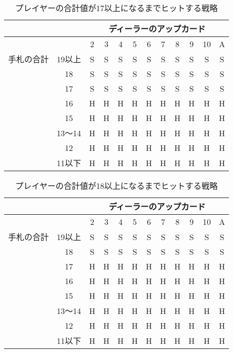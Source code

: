 \begin{table}[p]
  \centering
  \caption{プレイヤーの合計値が17以上になるまでヒットする戦略\label{hitleq17}}
  \begin{tabular}{|c|c|c|c|c|c|c|c|c|c|c|c|}
    \hline
    \multicolumn{2}{|c|}{} & \multicolumn{10}{|c|}{ディーラーのアップカード} \\ \hline
    \multicolumn{2}{|c|}{} & 2 & 3 & 4 & 5 & 6 & 7 & 8 & 9 & 10 & A \\ \hline
    手札の合計 & 19以上 & S & S & S & S & S & S & S & S & S & S \\ \cline{3-12}
              & 18 & S & S & S & S & S & S & S & S & S & S \\ \cline{3-12}
              & 17 & S & S & S & S & S & S & S & S & S & S \\ \cline{3-12}
              & 16 & H & H & H & H & H & H & H & H & H & H \\ \cline{3-12}
              & 15 & H & H & H & H & H & H & H & H & H & H \\ \cline{3-12}
              & 13～14 & H & H & H & H & H & H & H & H & H & H \\ \cline{3-12}
              & 12 & H & H & H & H & H & H & H & H & H & H \\ \cline{3-12}
              & 11以下 & H & H & H & H & H & H & H & H & H & H \\ \hline
  \end{tabular}
\end{table}

\begin{table}[p]
  \centering
  \caption{プレイヤーの合計値が18以上になるまでヒットする戦略\label{hitleq18}}
  \begin{tabular}{|c|c|c|c|c|c|c|c|c|c|c|c|}
    \hline
    \multicolumn{2}{|c|}{} & \multicolumn{10}{|c|}{ディーラーのアップカード} \\ \hline
    \multicolumn{2}{|c|}{} & 2 & 3 & 4 & 5 & 6 & 7 & 8 & 9 & 10 & A \\ \hline
    手札の合計 & 19以上 & S & S & S & S & S & S & S & S & S & S \\ \cline{3-12}
              & 18 & S & S & S & S & S & S & S & S & S & S \\ \cline{3-12}
              & 17 & H & H & H & H & H & H & H & H & H & H \\ \cline{3-12}
              & 16 & H & H & H & H & H & H & H & H & H & H \\ \cline{3-12}
              & 15 & H & H & H & H & H & H & H & H & H & H \\ \cline{3-12}
              & 13～14 & H & H & H & H & H & H & H & H & H & H \\ \cline{3-12}
              & 12 & H & H & H & H & H & H & H & H & H & H \\ \cline{3-12}
              & 11以下 & H & H & H & H & H & H & H & H & H & H \\ \hline
  \end{tabular}
\end{table}
\newpage

